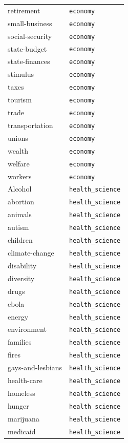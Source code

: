 \begin{longtable}{ll}
retirement & \texttt{economy} \\
small-business & \texttt{economy} \\
social-security & \texttt{economy} \\
state-budget & \texttt{economy} \\
state-finances & \texttt{economy} \\
stimulus & \texttt{economy} \\
taxes & \texttt{economy} \\
tourism & \texttt{economy} \\
trade & \texttt{economy} \\
transportation & \texttt{economy} \\
unions & \texttt{economy} \\
wealth & \texttt{economy} \\
welfare & \texttt{economy} \\
workers & \texttt{economy} \\
\midrule
Alcohol & \texttt{health\_science} \\
abortion & \texttt{health\_science} \\
animals & \texttt{health\_science} \\
autism & \texttt{health\_science} \\
children & \texttt{health\_science} \\
climate-change & \texttt{health\_science} \\
disability & \texttt{health\_science} \\
diversity & \texttt{health\_science} \\
drugs & \texttt{health\_science} \\
ebola & \texttt{health\_science} \\
energy & \texttt{health\_science} \\
environment & \texttt{health\_science} \\
families & \texttt{health\_science} \\
fires & \texttt{health\_science} \\
gays-and-lesbians & \texttt{health\_science} \\
health-care & \texttt{health\_science} \\
homeless & \texttt{health\_science} \\
hunger & \texttt{health\_science} \\
marijuana & \texttt{health\_science} \\
medicaid & \texttt{health\_science} \\

\end{longtable}
